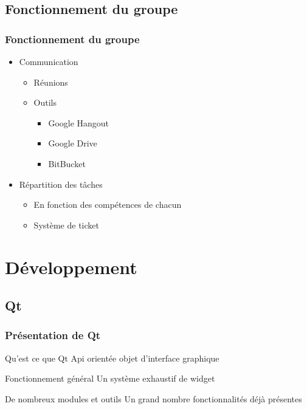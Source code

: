\documentclass{beamer}
\begin{document}
	\subsection{Fonctionnement du groupe}

	\begin{frame}
		\frametitle{Fonctionnement du groupe}

     \begin{itemize}
      \item Communication
      \pause
       \begin{itemize}
        \item Réunions
        \pause
        \item Outils
        \pause
          \begin{itemize}
            \item Google Hangout
            \pause
            \item Google Drive
            \pause
            \item BitBucket
          \end{itemize}
       \pause
       \end{itemize}
      \item Répartition des tâches
        \begin{itemize}
          \item En fonction des compétences de chacun
          \item Système de ticket
        \end{itemize}
    \end{itemize}

	\end{frame}



	\section{Développement}
        \subsection{Qt}
	\begin{frame}
	  \frametitle{Présentation de Qt}
          \begin{block}{Qu'est ce que Qt}
            Api orientée objet d'interface graphique
          \end{block}
          \pause
          \begin{block}{Fonctionnement général}
            Un système exhaustif de widget
          \end{block}
          \pause
          \begin{block}{De nombreux modules et outils}
            Un grand nombre fonctionnalités déjà présentes
          \end{block}{}
	\end{frame}
\end{document}
